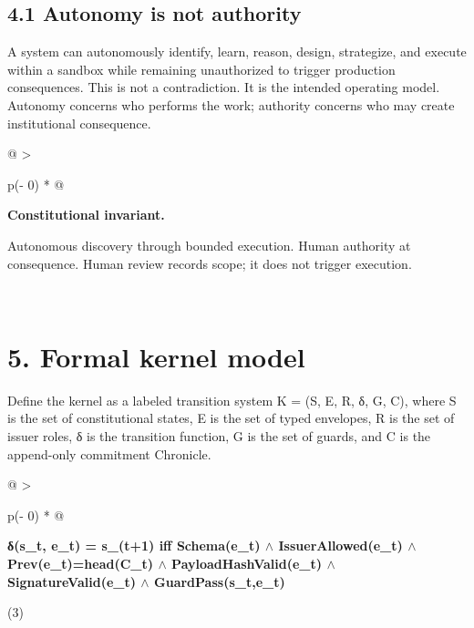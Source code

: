 \subsection{4.1 Autonomy is not
authority}\label{autonomy-is-not-authority}

A system can autonomously identify, learn, reason, design, strategize,
and execute within a sandbox while remaining unauthorized to trigger
production consequences. This is not a contradiction. It is the intended
operating model. Autonomy concerns who performs the work; authority
concerns who may create institutional consequence.

\begin{longtable}[]{@{}
  >{\raggedright\arraybackslash}p{(\columnwidth - 0\tabcolsep) * }@{}}
\toprule\noalign{}
\begin{minipage}[b]{\linewidth}\raggedright
\textbf{Constitutional invariant.}

Autonomous discovery through bounded execution. Human authority at
consequence. Human review records scope; it does not trigger execution.
\end{minipage} \\
\midrule\noalign{}
\endhead
\bottomrule\noalign{}
\endlastfoot
\end{longtable}

\section{5. Formal kernel model}\label{formal-kernel-model}

Define the kernel as a labeled transition system K = (S, E, R, δ, G, C),
where S is the set of constitutional states, E is the set of typed
envelopes, R is the set of issuer roles, δ is the transition function, G
is the set of guards, and C is the append-only commitment Chronicle.

\begin{longtable}[]{@{}
  >{\raggedright\arraybackslash}p{(\columnwidth - 0\tabcolsep) * }@{}}
\toprule\noalign{}
\begin{minipage}[b]{\linewidth}\raggedright
\textbf{δ(s\_\allowbreak{}t, e\_\allowbreak{}t) = s\_\allowbreak{}(t+1) iff Schema(e\_\allowbreak{}t) \(\wedge\) IssuerAllowed(e\_\allowbreak{}t)
\(\wedge\) Prev(e\_\allowbreak{}t)=head(C\_\allowbreak{}t) \(\wedge\) PayloadHashValid(e\_\allowbreak{}t) \(\wedge\) SignatureValid(e\_\allowbreak{}t)
\(\wedge\) GuardPass(s\_\allowbreak{}t,e\_\allowbreak{}t)}

(3)
\end{minipage} \\
\midrule\noalign{}
\endhead
\bottomrule\noalign{}
\endlastfoot
\end{longtable}

